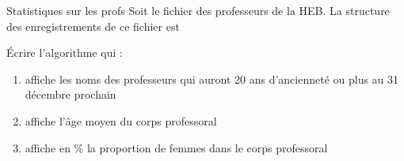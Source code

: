 \begin{Exercice}{Statistiques sur les profs}
	Soit le fichier  des professeurs de la
	HEB. La structure des enregistrements de ce fichier est {}
	
	
	Écrire l’algorithme qui :
	
	\begin{enumerate}[label=\alph*)]
		\item 
			affiche les noms des professeurs qui auront 20 ans d’ancienneté ou plus
			au 31 décembre prochain
		\item 
			affiche l’âge moyen du corps professoral
		\item 
			affiche en \% la proportion de femmes dans le corps professoral
	\end{enumerate}
\end{Exercice}

